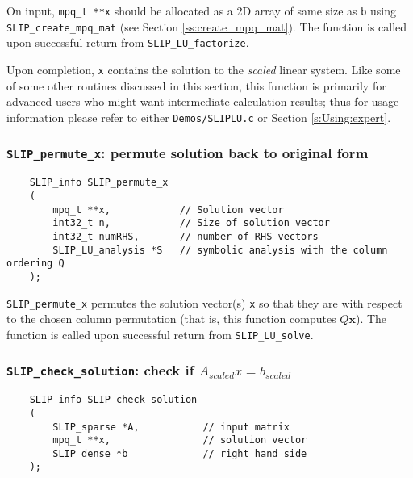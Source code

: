 \documentclass[12pt]{article}
\theoremstyle{definition}
\begin{document}
On input, \verb|mpq_t **x| should be allocated as a 2D array of same size as
\verb|b| using \verb|SLIP_create_mpq_mat| (see Section
\ref{ss:create_mpq_mat}). The function is called upon successful return from
\verb|SLIP_LU_factorize|.

Upon completion, \verb|x| contains the solution to the \textit{scaled} linear
system. Like some of some other routines discussed in this section, this
function is primarily for advanced users who might want intermediate
calculation results; thus for usage information please refer to either
\verb|Demos/SLIPLU.c| or Section \ref{s:Using:expert}.

\cprotect\subsubsection{\verb|SLIP_permute_x|: permute solution back to original form}
\label{ss:SLIP_permute_x}

\begin{mdframed}[userdefinedwidth=6in]
{\footnotesize
\begin{verbatim}
    SLIP_info SLIP_permute_x
    (
        mpq_t **x,            // Solution vector
        int32_t n,            // Size of solution vector
        int32_t numRHS,       // number of RHS vectors
        SLIP_LU_analysis *S   // symbolic analysis with the column ordering Q
    );
\end{verbatim}
} \end{mdframed}


\verb|SLIP_permute_x| permutes the solution vector(s) \verb|x| so that they are
with respect to the chosen column permutation (that is, this function computes
$Q \mathbf{x}$). The function is called upon successful return from
\verb|SLIP_LU_solve|.

\cprotect\subsubsection{\verb|SLIP_check_solution|: check if $A_{scaled}x=b_{scaled}$}

\begin{mdframed}[userdefinedwidth=6in]
{\footnotesize
\begin{verbatim}
    SLIP_info SLIP_check_solution
    (
        SLIP_sparse *A,           // input matrix
        mpq_t **x,                // solution vector
        SLIP_dense *b             // right hand side
    );
\end{verbatim}
} \end{mdframed}
\end{document}
